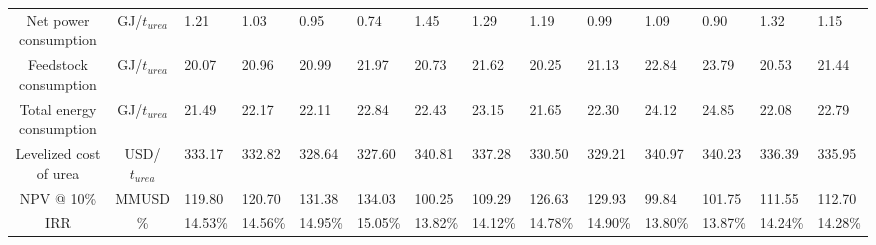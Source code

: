 \documentclass[a4paper, titlepage]{article}
\begin{document}
\begin{table}
\begin{tabular}{|| c | c | C{0.8cm} | C{0.8cm} | C{0.8cm} | C{0.8cm}| C{0.8cm} | C{0.8cm} |  C{0.8cm} | C{0.8cm}| C{0.8cm} | C{0.8cm} | C{0.8cm} |  C{0.8cm} ||}
        Net power consumption               & GJ/$t_{urea}$          & 1.21                                           & 1.03                                         & 0.95                                       & 0.74                                     & 1.45                                   & 1.29                                     & 1.19    & 0.99    & 1.09    & 0.90    & 1.32    & 1.15    \\
        Feedstock consumption               & GJ/$t_{urea}$          & 20.07                                          & 20.96                                        & 20.99                                      & 21.97                                    & 20.73                                  & 21.62                                    & 20.25   & 21.13   & 22.84   & 23.79   & 20.53   & 21.44   \\
        Total energy consumption            & GJ/$t_{urea}$          & 21.49                                          & 22.17                                        & 22.11                                      & 22.84                                    & 22.43                                  & 23.15                                    & 21.65   & 22.30   & 24.12   & 24.85   & 22.08   & 22.79   \\
        \hline
        Levelized cost of urea              & USD/$t_{urea}$         & 333.17                                         & 332.82                                       & 328.64                                     & 327.60                                   & 340.81                                 & 337.28                                   & 330.50  & 329.21  & 340.97  & 340.23  & 336.39  & 335.95  \\
        NPV @ 10\%                          & MMUSD                  & 119.80                                         & 120.70                                       & 131.38                                     & 134.03                                   & 100.25                                 & 109.29                                   & 126.63  & 129.93  & 99.84   & 101.75  & 111.55  & 112.70  \\
        IRR                                 & \%                     & 14.53\%                                        & 14.56\%                                      & 14.95\%                                    & 15.05\%                                  & 13.82\%                                & 14.12\%                                  & 14.78\% & 14.90\% & 13.80\% & 13.87\% & 14.24\% & 14.28\% \\


\end{tabular}
\end{table}
\end{document}
